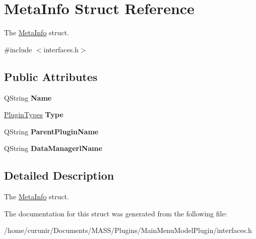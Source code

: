 \hypertarget{struct_meta_info}{}\section{Meta\+Info Struct Reference}
\label{struct_meta_info}


The \hyperlink{struct_meta_info}{Meta\+Info} struct.  




{\ttfamily \#include $<$interfaces.\+h$>$}

\subsection*{Public Attributes}
\begin{DoxyCompactItemize}
\item 
Q\+String {\bfseries Name}\hypertarget{struct_meta_info_a5a2f44643b5406699d1fb9ef742ab331}{}\label{struct_meta_info_a5a2f44643b5406699d1fb9ef742ab331}

\item 
\hyperlink{group___main_menu_module_ga9b3bee49ce70df90694056c2f48c2e77}{Plugin\+Types} {\bfseries Type}\hypertarget{struct_meta_info_aaaf1d51db4890bb4f5cbb08ea15b5940}{}\label{struct_meta_info_aaaf1d51db4890bb4f5cbb08ea15b5940}

\item 
Q\+String {\bfseries Parent\+Plugin\+Name}\hypertarget{struct_meta_info_a01ddb956e9390d748f8d3812521d17ff}{}\label{struct_meta_info_a01ddb956e9390d748f8d3812521d17ff}

\item 
Q\+String {\bfseries Data\+Managerl\+Name}\hypertarget{struct_meta_info_aa2b9d929a6ef2956c60d4bb029371669}{}\label{struct_meta_info_aa2b9d929a6ef2956c60d4bb029371669}

\end{DoxyCompactItemize}


\subsection{Detailed Description}
The \hyperlink{struct_meta_info}{Meta\+Info} struct. 

The documentation for this struct was generated from the following file\+:\begin{DoxyCompactItemize}
\item 
/home/curunir/\+Documents/\+M\+A\+S\+S/\+Plugins/\+Main\+Menu\+Model\+Plugin/interfaces.\+h\end{DoxyCompactItemize}

